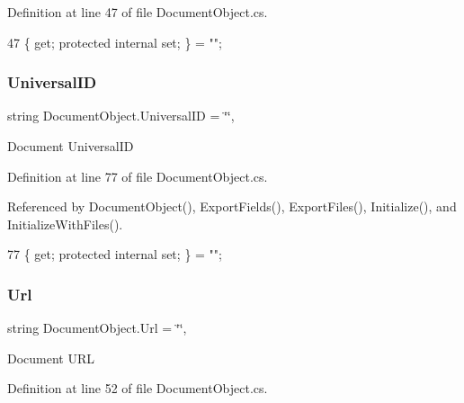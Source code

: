 Definition at line 47 of file Document\+Object.\+cs.


\begin{DoxyCode}
47 \{ \textcolor{keyword}{get}; \textcolor{keyword}{protected} \textcolor{keyword}{internal} \textcolor{keyword}{set}; \} = \textcolor{stringliteral}{""};
\end{DoxyCode}
\mbox{\label{class_document_object_a8b96d04632a2802e7cc5466ca5cee8cf}} 
\subsubsection{\texorpdfstring{Universal\+ID}{UniversalID}}
{\footnotesize\ttfamily string Document\+Object.\+Universal\+ID = \char`\"{}\char`\"{}\hspace{0.3cm}{\ttfamily [get]}, {\ttfamily [set]}}



Document Universal\+ID 



Definition at line 77 of file Document\+Object.\+cs.



Referenced by Document\+Object(), Export\+Fields(), Export\+Files(), Initialize(), and Initialize\+With\+Files().


\begin{DoxyCode}
77 \{ \textcolor{keyword}{get}; \textcolor{keyword}{protected} \textcolor{keyword}{internal} \textcolor{keyword}{set}; \} = \textcolor{stringliteral}{""};
\end{DoxyCode}
\mbox{\label{class_document_object_ac86b730cf8931b2221af577d32ca2f31}} 
\subsubsection{\texorpdfstring{Url}{Url}}
{\footnotesize\ttfamily string Document\+Object.\+Url = \char`\"{}\char`\"{}\hspace{0.3cm}{\ttfamily [get]}, {\ttfamily [set]}}



Document U\+RL 



Definition at line 52 of file Document\+Object.\+cs.


